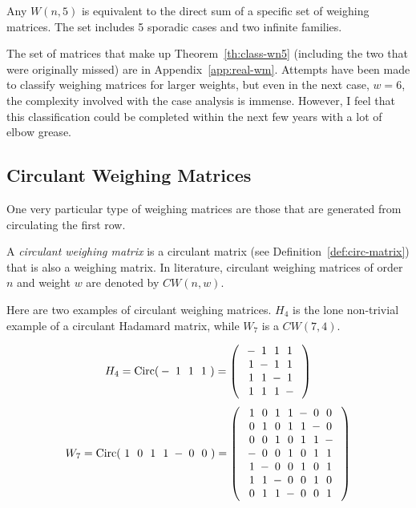 \begin{theorem} \label{th:class-wn5}
 Any $W(n,5)$ is equivalent to the direct sum of a specific set of weighing matrices. The set includes 5 sporadic cases and two infinite families.
\end{theorem}

The set of matrices that make up Theorem~\ref{th:class-wn5} (including the two that were originally missed) are in Appendix~\ref{app:real-wm}. Attempts have been made to classify weighing matrices for larger weights, but even in the next case, $w=6$, the complexity involved with the case analysis is immense. However, I feel that this classification could be completed within the next few years with a lot of elbow grease.


\subsection[Circulant Weighing Matrices]{Circulant Weighing Matrices}
\label{subsec:circ-weigh}

One very particular type of weighing matrices are those that are generated from circulating the first row.

\begin{definition} \label{def:circ-weigh}
 A {\it circulant weighing matrix} is a circulant matrix (see Definition~\ref{def:circ-matrix}) that is also a weighing matrix. In literature, circulant weighing matrices of order $n$ and weight $w$ are denoted by $CW(n,w)$.
\end{definition}

\begin{example} \label{ex:circ-weigh}
 Here are two examples of circulant weighing matrices. $H_4$ is the lone non-trivial example of a circulant Hadamard matrix, while $W_7$ is a $CW(7,4)$.

 $$H_4 = \text{Circ}(\Zm\Zp\Zp\Zp) = \left(\begin{array}{c}\Zm\Zp\Zp\Zp\\\Zp\Zm\Zp\Zp\\\Zp\Zp\Zm\Zp\\\Zp\Zp\Zp\Zm\\\end{array}\right)$$
 $$W_7 = \text{Circ}(\Zp\Zz\Zp\Zp\Zm\Zz\Zz) = \left(\begin{array}{c}
\Zp\Zz\Zp\Zp\Zm\Zz\Zz\\
\Zz\Zp\Zz\Zp\Zp\Zm\Zz\\
\Zz\Zz\Zp\Zz\Zp\Zp\Zm\\
\Zm\Zz\Zz\Zp\Zz\Zp\Zp\\
\Zp\Zm\Zz\Zz\Zp\Zz\Zp\\
\Zp\Zp\Zm\Zz\Zz\Zp\Zz\\
\Zz\Zp\Zp\Zm\Zz\Zz\Zp\\
\end{array}\right)$$

\end{example}



